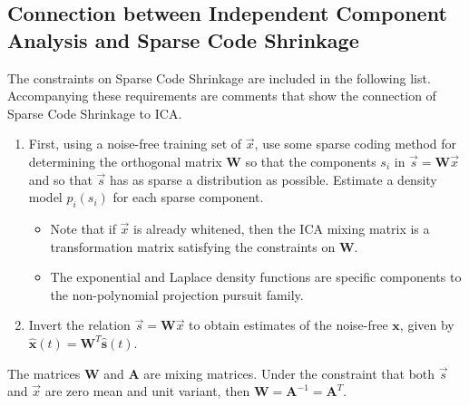 \documentclass[11pt]{article}
\begin{document}


\subsection{Connection between Independent Component Analysis and Sparse Code Shrinkage}
\label{ica-scs-connection}

The constraints on Sparse Code Shrinkage are included in the following list.  Accompanying these requirements are comments that show the connection of Sparse Code Shrinkage to ICA. 
\begin{enumerate}
\item First, using a noise-free training set of $\vec{x}$, use some sparse coding method for determining the orthogonal matrix $\mathbf{W}$ so that the components $s_i$ in $\vec{s} = \mathbf{W}\vec{x}$ and so that $\vec{s}$ has as sparse a distribution as possible.  Estimate a density model $p_i (s_i)$ for each sparse component. 
\begin{itemize}
	\item Note that if $\vec{x}$ is already whitened, then the ICA mixing matrix is a transformation matrix satisfying the constraints on $\mathbf{W}$.
	\item The exponential and Laplace density functions are specific components to the non-polynomial projection pursuit family. 
\end{itemize}


\item Invert the relation $\vec{s} = \mathbf{W}\vec{x}$  to obtain estimates of the noise-free $\mathbf{x}$, given by $\mathbf{\hat{x}}(t) = \mathbf{W}^T \hat{\mathbf{s}}(t)$.
\end{enumerate}
The matrices $\mathbf{W}$ and $\mathbf{A}$ are mixing matrices.  Under the constraint that both  $\vec{s}$ and $\vec{x}$ are zero mean and unit variant, then $\mathbf{W}= \mathbf{A}^{-1} = \mathbf{A}^T$.
\end{document}
